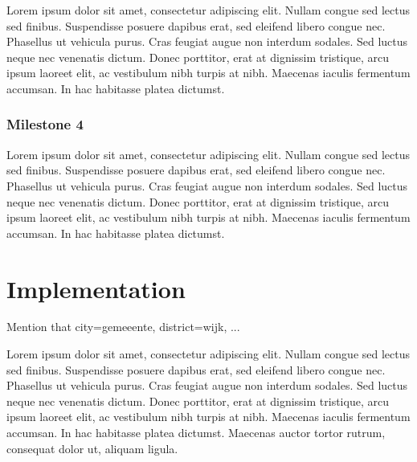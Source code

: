 \documentclass{utitcphd_overleaf}
\begin{document}
Lorem ipsum dolor sit amet, consectetur adipiscing elit. Nullam congue sed lectus sed finibus. Suspendisse posuere dapibus erat, sed eleifend libero congue nec. Phasellus ut vehicula purus. Cras feugiat augue non interdum sodales. Sed luctus neque nec venenatis dictum. Donec porttitor, erat at dignissim tristique, arcu ipsum laoreet elit, ac vestibulum nibh turpis at nibh. Maecenas iaculis fermentum accumsan. In hac habitasse platea dictumst.

\subsection{Milestone 4}

Lorem ipsum dolor sit amet, consectetur adipiscing elit. Nullam congue sed lectus sed finibus. Suspendisse posuere dapibus erat, sed eleifend libero congue nec. Phasellus ut vehicula purus. Cras feugiat augue non interdum sodales. Sed luctus neque nec venenatis dictum. Donec porttitor, erat at dignissim tristique, arcu ipsum laoreet elit, ac vestibulum nibh turpis at nibh. Maecenas iaculis fermentum accumsan. In hac habitasse platea dictumst.

\chapter{Implementation}
\label{chap:implementation}

Mention that city=gemeeente, district=wijk, ... 

Lorem ipsum dolor sit amet, consectetur adipiscing elit. Nullam congue sed lectus sed finibus. Suspendisse posuere dapibus erat, sed eleifend libero congue nec. Phasellus ut vehicula purus. Cras feugiat augue non interdum sodales. Sed luctus neque nec venenatis dictum. Donec porttitor, erat at dignissim tristique, arcu ipsum laoreet elit, ac vestibulum nibh turpis at nibh. Maecenas iaculis fermentum accumsan. In hac habitasse platea dictumst. Maecenas auctor tortor rutrum, consequat dolor ut, aliquam ligula.



\end{document}

